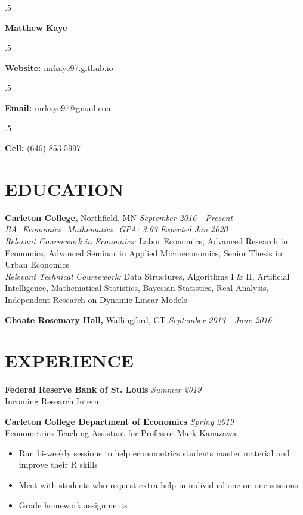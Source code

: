 \documentclass[margin, 9pt]{res} %
\begin{document}
\singlespacing

\moveleft.5\hoffset\centerline{\LARGE\bf Matthew Kaye} %
\medskip
\moveleft.5\hoffset\centerline{\textbf{Website:} mrkaye97.github.io}
\moveleft.5\hoffset\centerline{\textbf{Email:} mrkaye97@gmail.com}
\moveleft.5\hoffset\centerline{\textbf{Cell:} (646) 853-5997}


\begin{resume}


\section{EDUCATION}

{\sl} \textbf{Carleton College,} Northfield, MN \hfill \textit{September 2016 - Present}\smallskip\\
{\sl BA, Economics, Mathematics. GPA: 3.63} \hfill \textit{Expected Jan 2020}\smallskip\\
{\sl Relevant Coursework in Economics: } Labor Economics, Advanced Research in Economics, Advanced Seminar in Applied Microeconomics, Senior Thesis in Urban Economics\smallskip\\
{\sl Relevant Technical Coursework: } Data Structures, Algorithms I \& II, Artificial Intelligence, Mathematical Statistics, Bayesian Statistics, Real Analysis, Independent Research on Dynamic Linear Models

{\sl} \textbf{Choate Rosemary Hall,} Wallingford, CT \hfill \textit{September 2013 - June 2016}

\section{EXPERIENCE}
{\sl} \textbf{Federal Reserve Bank of St. Louis} \hfill \textit{Summer 2019}\smallskip\\
{\sl} Incoming Research Intern \smallskip

{\sl} \textbf{Carleton College Department of Economics} \hfill \textit{Spring 2019}\\
{\sl} Econometrics Teaching Assistant for Professor Mark Kanazawa\smallskip
{\sl} \begin{itemize}
	\item Run bi-weekly sessions to help econometrics students master material and improve their R skills
	\item Meet with students who request extra help in individual one-on-one sessions
	\item Grade homework assignments
\end{itemize}



\end{resume}
\end{document}
